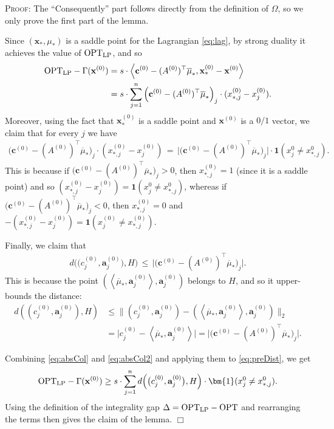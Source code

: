 \documentclass{article}
\newcommand{\av}[0]{\mathbf{a}}
\newcommand{\cv}[0]{\mathbf{c}}
\newcommand{\xv}[0]{\mathbf{x}}
\newcommand{\ones}{{\bm{1}}}
\newcommand{\LP}{\text{LP}}
\newenvironment{proof}[1][]
   {\textsc{Proof#1: }}
   {\hfill$\Box$\smallskip}
\newcommand{\iprod}[2]{\left\langle {#1}, {#2} \right\rangle}
\newcommand{\OPT}{\textup{OPT}}
\begin{document}
\begin{proof}
    The ``Consequently'' part follows directly from the definition of $\Omega$, so we only prove the first part of the lemma.

    Since $(\xv_*,\mu_*)$ is a saddle point for the Lagrangian \eqref{eq:lag}, by strong duality it achieves the value of $\OPT_{\LP}$, and so
    \begin{align}
        \OPT_{\LP} - \Gamma(\xv^{(0)}) &= s \cdot \iprod{\cv^{(0)} - (A^{(0)})^{\top} \overline{\mu}_*}{\xv^{(0)}_* - \xv^{(0)}} \notag\\
        &= s \cdot \sum_{j = 1}^n \Big(\cv^{(0)} - (A^{(0)})^{\top} \overline{\mu}_*\Big)_j \cdot (x^{(0)}_{*,j} - x^{(0)}_j). \label{eq:preDist}
    \end{align}
    Moreover, using the fact that $\xv^{(0)}_*$ is a saddle point and $\xv^{(0)}$ is a $0/1$ vector, we claim that for every $j$ we have
    \begin{align}
        \Big(\cv^{(0)} - (A^{(0)})^{\top} \overline{\mu}_*\Big)_j \cdot (x^{(0)}_{*,j} - x^{(0)}_j) \,=\, \Big|\Big(\cv^{(0)} - (A^{(0)})^{\top} \overline{\mu}_*\Big)_j\Big| \cdot \ones(x^0_j \neq x^0_{*,j}). \label{eq:absCol}
    \end{align}
    This is because if $\big(\cv^{(0)} - (A^{(0)})^{\top} \overline{\mu}_*\big)_j > 0$, then $x^{(0)}_{*,j} = 1$ (since it is a saddle point) and so $(x^{(0)}_{*,j} - x^{(0)}_j) = \ones(x^0_j \neq x^0_{*,j})$, whereas if $\big(\cv^{(0)} - (A^{(0)})^{\top} \overline{\mu}_*\big)_j < 0$, then $x^{(0)}_{*,j} = 0$ and $- (x^{(0)}_{*,j} - x^{(0)}_j) = \ones(x^{(0)}_j \neq x^{(0)}_{*,j})$.

    Finally, we claim that
    \begin{align}
        d\Big(\big(c^{(0)}_j, \av^{(0)}_j\big), H\Big) \,\le\, \Big|\Big(\cv^{(0)} - (A^{(0)})^{\top} \overline{\mu}_*\Big)_j\Big|. \label{eq:absCol2}
    \end{align}
    This is because the point $\left(\iprod{\overline{\mu}_*}{\av^{(0)}_j}, \av^{(0)}_j\right)$ belongs to $H$, and so it upper-bounds the distance:
    \begin{align*}
        d\left(\left(c^{(0)}_j, \av^{(0)}_j\right), H\right)
        &\le \Big\|\left(c^{(0)}_j, \av^{(0)}_j\right) - \left(\iprod{\overline{\mu}_*}{\av^{(0)}_j}, \av^{(0)}_j\right)\Big\|_2 \\
        &= \Big|c^{(0)}_j - \iprod{\overline{\mu}_*}{\av^{(0)}_j}\Big|
        = \Big|\big(\cv^{(0)} - (A^{(0)})^{\top} \overline{\mu}_*\big)_j\Big|.
    \end{align*}

    Combining \eqref{eq:absCol} and \eqref{eq:absCol2} and applying them to \eqref{eq:preDist}, we get
    \begin{align*}
        \OPT_{\LP} - \Gamma(\xv^{(0)}) \ge s \cdot \sum_{j = 1}^n d\Big(\big(c^{(0)}_j, \av^{(0)}_j\big), H\Big) \cdot \ones(x^0_j \neq x^0_{*,j}).
    \end{align*}
    Using the definition of the integrality gap $\Delta = \OPT_{\LP} - \OPT$ and rearranging the terms then gives the claim of the lemma.
\end{proof}
\end{document}
